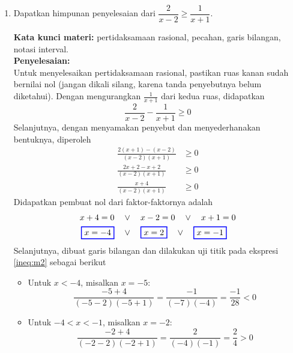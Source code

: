 \documentclass[10pt,openany,a4paper]{article}
\theoremstyle{definition}
\theoremstyle{definition}
\theoremstyle{plain}
\newenvironment{jawab}[2][tes]{%
\par\noindent\textbf{Kata kunci materi:} #1.\\
\textbf{Penyelesaian:} #2%
}{}
\begin{document}
\begin{enumerate}
    \item Dapatkan himpunan penyelesaian dari $\dfrac{2}{x-2}\geq\dfrac{1}{x+1}$.
    \begin{jawab}[pertidaksamaan rasional, pecahan, garis bilangan, notasi interval]{~\\
        Untuk menyelesaikan pertidaksamaan rasional, pastikan ruas kanan sudah bernilai nol (jangan dikali silang, karena tanda penyebutnya belum diketahui). Dengan mengurangkan \(\frac{1}{x+1}\) dari kedua ruas, didapatkan
        \[
        \frac{2}{x-2} - \frac{1}{x+1} \geq 0
        \]
        Selanjutnya, dengan menyamakan penyebut dan menyederhanakan bentuknya, diperoleh
        \begin{align}
            \frac{2(x+1)-(x-2)}{(x-2)(x+1)} &\geq 0\nonumber\\
            \frac{2x+2-x+2}{(x-2)(x+1)} &\geq 0\nonumber \\
            \frac{x+4}{(x-2)(x+1)} &\geq 0 \label{ineq:m2}
        \end{align}
        Didapatkan pembuat nol dari faktor-faktornya adalah
        \begin{align*}
            x+4 = 0 \quad &\vee\quad  x-2 = 0 \quad\vee\quad x+1=0\\
            \colorlet{oldcolor}{.}
        \color{blue}
        \setlength{\fboxrule}{1pt} \boxed{\color{oldcolor}x=-4}\color{oldcolor} \quad &\vee\quad \colorlet{oldcolor}{.}
        \color{blue}
        \setlength{\fboxrule}{1pt} \boxed{\color{oldcolor}x=2}\color{oldcolor} \quad\vee\quad \colorlet{oldcolor}{.}
        \color{blue}
        \setlength{\fboxrule}{1pt} \boxed{\color{oldcolor}x=-1}\color{oldcolor}
        \end{align*}
        Selanjutnya, dibuat garis bilangan dan dilakukan uji titik pada ekspresi \eqref{ineq:m2} sebagai berikut
        \begin{itemize}
            \item Untuk \(x < -4\), misalkan \(x = -5\):
            \[
            \frac{-5+4}{(-5-2)(-5+1)} = \frac{-1}{(-7)(-4)} = \frac{-1}{28} < 0
            \]
            \item Untuk \(-4 < x < -1\), misalkan \(x = -2\):
            \[
            \frac{-2+4}{(-2-2)(-2+1)} = \frac{2}{(-4)(-1)} = \frac{2}{4} > 0
\]
\end{itemize}}
\end{jawab}
\end{enumerate}
\end{document}
